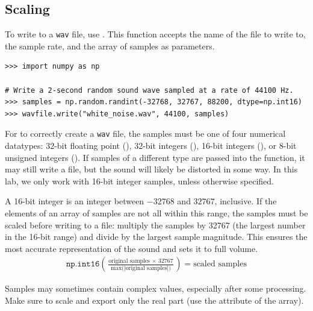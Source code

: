 \subsection*{Scaling} %

To write to a \texttt{wav} file, use .
This function accepts the name of the file to write to, the sample rate, and the array of samples as parameters.

\begin{lstlisting}
>>> import numpy as np

# Write a 2-second random sound wave sampled at a rate of 44100 Hz.
>>> samples = np.random.randint(-32768, 32767, 88200, dtype=np.int16)
>>> wavfile.write("white_noise.wav", 44100, samples)
\end{lstlisting}

For  to correctly create a \texttt{wav} file, the samples must be one of four numerical datatypes: 32-bit floating point (), 32-bit integers (), 16-bit integers (), or 8-bit unsigned integers ().
If samples of a different type are passed into the function, it may still write a file, but the sound will likely be distorted in some way.
In this lab, we only work with 16-bit integer samples, unless otherwise specified.

A 16-bit integer is an integer between $-32768$ and $32767$, inclusive.
If the elements of an array of samples are not all within this range, the samples must be scaled before writing to a file: multiply the samples by 32767 (the largest number in the 16-bit range) and divide by the largest sample magnitude.
This ensures the most accurate representation of the sound and sets it to full volume.
\begin{align}
\label{eq:dft-scale-samples}
\texttt{np.int16}\left(\frac{\mbox{original samples $\times$ 32767}}{\mbox{$\max$(|original samples|)}}\right) = \mbox{scaled samples}
\end{align}

Samples may sometimes contain complex values, especially after some processing.
Make sure to scale and export only the real part (use the  attribute of the array).

